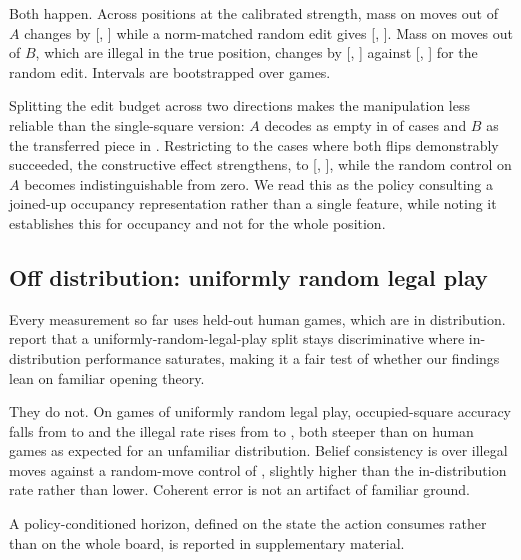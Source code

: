 \documentclass[manuscript, screen, review]{jair}
\theoremstyle{remark}
\begin{document}
Both happen. Across  positions at the calibrated strength, mass on
moves out of $A$ changes by  [,
] while a norm-matched random edit gives 
[, ]. Mass on moves out of $B$, which
are illegal in the true position, changes by  [,
] against  [,
] for the random edit. Intervals are bootstrapped over
games.

Splitting the edit budget across two directions makes the manipulation less
reliable than the single-square version: $A$ decodes as empty in
 of cases and $B$ as the transferred piece in .
Restricting to the  cases where both flips demonstrably
succeeded, the constructive effect strengthens, to 
[, ], while the random control on $A$
becomes indistinguishable from zero. We read this as the policy consulting a
joined-up occupancy representation rather than a single feature, while noting it
establishes this for occupancy and not for the whole position.

\subsection{Off distribution: uniformly random legal play}
\label{sec:randomplay}

Every measurement so far uses held-out human games, which are in distribution.
\citet{walker2026chess} report that a uniformly-random-legal-play split stays
discriminative where in-distribution performance saturates, making it a fair test
of whether our findings lean on familiar opening theory.

They do not. On  games of uniformly random legal play,
occupied-square accuracy falls from  to  and
the illegal rate rises from  to , both
steeper than on human games as expected for an unfamiliar distribution. Belief
consistency is  over  illegal moves against a
random-move control of , slightly higher than the in-distribution
rate rather than lower. Coherent error is not an artifact of familiar ground.

A policy-conditioned horizon, defined on the state the action consumes rather than on the whole board, is reported in supplementary material.
\end{document}

